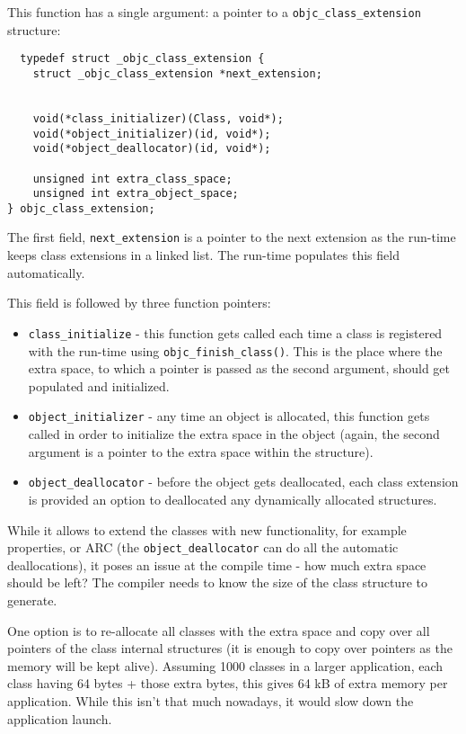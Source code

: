 This function has a single argument: a pointer to a \verb=objc_class_extension= structure:

\begin{verbatim}
  typedef struct _objc_class_extension {
	struct _objc_class_extension *next_extension;


	void(*class_initializer)(Class, void*);
	void(*object_initializer)(id, void*);
	void(*object_deallocator)(id, void*);
	
	unsigned int extra_class_space;
	unsigned int extra_object_space;
} objc_class_extension;
\end{verbatim}

The first field, \verb=next_extension= is a pointer to the next extension as the run-time keeps class extensions in a linked list. The run-time populates this field automatically.

This field is followed by three function pointers:

\begin{itemize}
  \item \verb=class_initialize= - this function gets called each time a class is registered with the run-time using \verb=objc_finish_class()=. This is the place where the extra space, to which a pointer is passed as the second argument, should get populated and initialized.
  \item \verb=object_initializer= - any time an object is allocated, this function gets called in order to initialize the extra space in the object (again, the second argument is a pointer to the extra space within the structure).
  \item \verb=object_deallocator= - before the object gets deallocated, each class extension is provided an option to deallocated any dynamically allocated structures.
\end{itemize}

While it allows to extend the classes with new functionality, for example properties, or ARC (the \verb=object_deallocator= can do all the automatic deallocations), it poses an issue at the compile time - how much extra space should be left? The compiler needs to know the size of the class structure to generate.

One option is to re-allocate all classes with the extra space and copy over all pointers of the class internal structures (it is enough to copy over pointers as the memory will be kept alive). Assuming 1000 classes in a larger application, each class having 64 bytes + those extra bytes, this gives 64 kB of extra memory per application. While this isn't that much nowadays, it would slow down the application launch.

